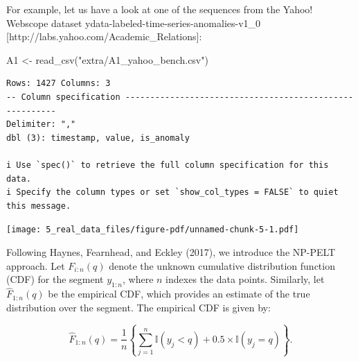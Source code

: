 \documentclass[
  letterpaper,
  DIV=11,
  numbers=noendperiod]{scrreprt}
\newenvironment{Shaded}{\begin{snugshade}}{\end{snugshade}}
\newcommand{\AttributeTok}[1]{\textcolor[rgb]{0.40,0.45,0.13}{#1}}
\newcommand{\DecValTok}[1]{\textcolor[rgb]{0.68,0.00,0.00}{#1}}
\newcommand{\FunctionTok}[1]{\textcolor[rgb]{0.28,0.35,0.67}{#1}}
\newcommand{\NormalTok}[1]{\textcolor[rgb]{0.00,0.23,0.31}{#1}}
\newcommand{\OtherTok}[1]{\textcolor[rgb]{0.00,0.23,0.31}{#1}}
\newcommand{\SpecialCharTok}[1]{\textcolor[rgb]{0.37,0.37,0.37}{#1}}
\newcommand{\StringTok}[1]{\textcolor[rgb]{0.13,0.47,0.30}{#1}}
\begin{document}
For example, let us have a look at one of the sequences from the Yahoo!
Webscope dataset ydata-labeled-time-series-anomalies-v1\_0
{[}http://labs.yahoo.com/Academic\_Relations{]}:

\begin{Shaded}
\begin{Highlighting}[]
\NormalTok{A1 }\OtherTok{\textless{}{-}} \FunctionTok{read\_csv}\NormalTok{(}\StringTok{"extra/A1\_yahoo\_bench.csv"}\NormalTok{)}
\end{Highlighting}
\end{Shaded}

\begin{verbatim}
Rows: 1427 Columns: 3
-- Column specification --------------------------------------------------------
Delimiter: ","
dbl (3): timestamp, value, is_anomaly

i Use `spec()` to retrieve the full column specification for this data.
i Specify the column types or set `show_col_types = FALSE` to quiet this message.
\end{verbatim}

\begin{Shaded}
\end{Shaded}

\texttt{[image: 5\_real\_data\_files/figure-pdf/unnamed-chunk-5-1.pdf]}

Following Haynes, Fearnhead, and Eckley (2017), we introduce the NP-PELT
approach. Let \(F_{i:n}(q)\) denote the unknown cumulative distribution
function (CDF) for the segment \(y_{1:n}\), where \(n\) indexes the data
points. Similarly, let \(\hat{F}_{1:n}(q)\) be the empirical CDF, which
provides an estimate of the true distribution over the segment. The
empirical CDF is given by:

\[
\hat{F}_{1:n}(q) = \frac{1}{n} \left\{ \sum_{j=1}^{n} \mathbb{I}(y_j < q) + 0.5 \times \mathbb{I}(y_j = q) \right\}.
\]
\end{document}
